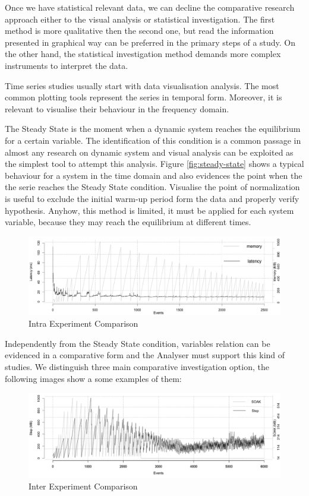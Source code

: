Once we have statistical relevant data, we can decline the comparative research approach either to the visual analysis or statistical investigation. The first method is more qualitative then the second one, but read the information presented in graphical way can be preferred in the primary steps of a study. On the other hand, the statistical investigation method demands more complex instruments to interpret the data. 

Time series studies usually start with data visualisation analysis. The most common  plotting tools represent the series in temporal form. Moreover, it is relevant to visualise their behaviour in the frequency domain. 

The Steady State is the moment when a dynamic system reaches the equilibrium for a certain variable. The identification of this condition is a common passage in almost any research on dynamic system and visual analysis can be exploited as the simplest tool to attempt this analysis. Figure \ref{fig:steady-state} shows a typical behaviour for a system in the time domain and also evidences the point when the the serie reaches the Steady State condition. Visualise the point of normalization is useful to exclude the initial warm-up period form the data and properly verify hypothesis. Anyhow, this method is limited, it must be applied for each system variable, because they may reach the equilibrium at different times.

\begin{figure}[tbh]
  \centering
	\includegraphics[width=0.80\linewidth]{images/comp-intra}
	\caption{Intra Experiment Comparison} 
  	\label{fig:comp-intra}
\end{figure}

Independently from the Steady State condition, variables relation can be evidenced in a comparative form and the Analyser must support this kind of studies. We distinguish three main comparative investigation option, the following images show a some examples of them:

\begin{figure}[tbh]
  \centering
	\includegraphics[width=0.80\linewidth]{images/comp-inter}
	\caption{Inter Experiment Comparison} 
  	\label{fig:comp-inter}
\end{figure}


